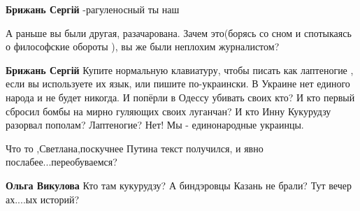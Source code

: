 \begin{itemize}
\begin{itemize}
 
\textbf{Брижань Сергій} -рагуленосный ты наш\Laughey[1.0][white]

 
А раньше вы были другая, разачарована. Зачем это(борясь со сном и спотыкаясь о
философские обороты ), вы же были неплохим журналистом?

 
\textbf{Брижань Сергій} Купите нормальную клавиатуру, чтобы писать как лаптеногие , если вы используете их язык, или пишите по-украински.
В Украине нет единого народа и не будет никогда.
И попёрли в Одессу убивать своих кто? И кто первый сбросил бомбы на мирно гуляющих своих луганчан? И кто Инну Кукурудзу разорвал пополам?
Лаптеногие? Нет! Мы - единонародные украинцы.

 
Что то ,Светлана,поскучнее Путина текст получился, и явно послабее...переобуваемся?

 
\textbf{Ольга Викулова} Кто там кукурудзу? А биндэровцы Казань не брали? Тут вечер ах....ых историй?

 

\end{itemize}
\end{itemize}
